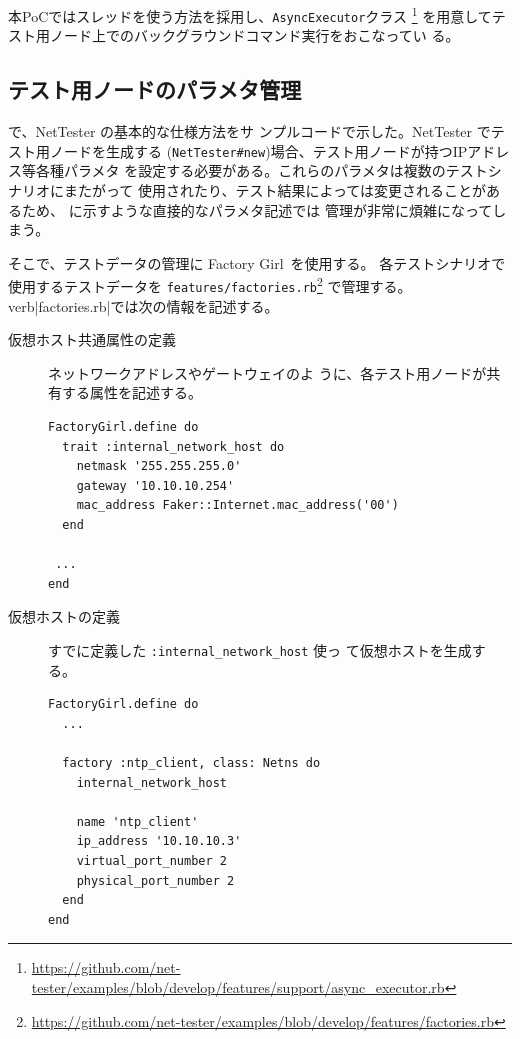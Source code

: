 本PoCではスレッドを使う方法を採用し、\verb|AsyncExecutor|クラス
\footnote{\url{https://github.com/net-tester/examples/blob/develop/features/support/async_executor.rb}}
を用意してテスト用ノード上でのバックグラウンドコマンド実行をおこなってい
る。

  \subsection{テスト用ノードのパラメタ管理}
  \label{sec:test-parameter-management}

で、NetTester の基本的な仕様方法をサ
ンプルコードで示した。NetTester でテスト用ノードを生成する
(\verb|NetTester#new|)場合、テスト用ノードが持つIPアドレス等各種パラメタ
を設定する必要がある。これらのパラメタは複数のテストシナリオにまたがって
使用されたり、テスト結果によっては変更されることがあるため、
に示すような直接的なパラメタ記述では
管理が非常に煩雑になってしまう。

そこで、テストデータの管理に Factory Girl~\cite{factory-girl}を使用する。
各テストシナリオで使用するテストデータを
\verb|features/factories.rb|\footnote{\url{https://github.com/net-tester/examples/blob/develop/features/factories.rb}}
で管理する。verb|factories.rb|では次の情報を記述する。
\begin{description}
 \item[仮想ホスト共通属性の定義] ネットワークアドレスやゲートウェイのよ
            うに、各テスト用ノードが共有する属性を記述する。
\begin{lstlisting}
FactoryGirl.define do
  trait :internal_network_host do
    netmask '255.255.255.0'
    gateway '10.10.10.254'
    mac_address Faker::Internet.mac_address('00')
  end

 ...
end
\end{lstlisting}
 \item[仮想ホストの定義] すでに定義した \verb|:internal_network_host| 使っ
            て仮想ホストを生成する。
\begin{lstlisting}
FactoryGirl.define do
  ...

  factory :ntp_client, class: Netns do
    internal_network_host

    name 'ntp_client'
    ip_address '10.10.10.3'
    virtual_port_number 2
    physical_port_number 2
  end
end
\end{lstlisting}
\end{description}

